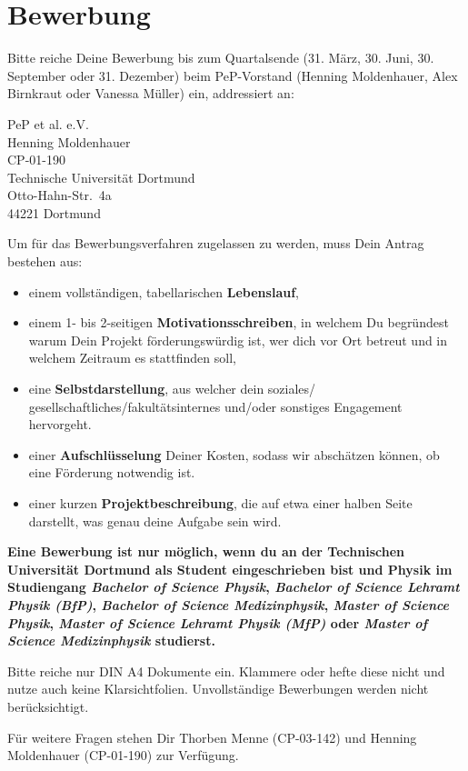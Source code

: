 \documentclass[
  paper=a4,
  fontsize=12pt,
  DIV=16,
  headheight=52pt,
  footheight=45pt,
  headinclude,
  parskip=full,
]{scrartcl}
\begin{document}
\section*{Bewerbung}

Bitte reiche Deine Bewerbung bis zum Quartalsende (31. März, 30. Juni,
30. September oder 31. Dezember) beim PeP-Vorstand
(Henning Moldenhauer, Alex Birnkraut oder Vanessa Müller) ein,
addressiert an:

PeP et al. e.V.\\
Henning Moldenhauer\\
CP-01-190\\[0.5\baselineskip]
Technische Universität Dortmund\\
Otto-Hahn-Str.~4a\\
44221 Dortmund

Um für das Bewerbungsverfahren zugelassen zu werden, muss Dein Antrag bestehen aus:
\begin{itemize}
  \item einem vollständigen, tabellarischen \textbf{Lebenslauf},
  \item einem 1- bis 2-seitigen \textbf{Motivationsschreiben}, in welchem Du
	  begründest warum Dein Projekt förderungswürdig ist, wer dich vor Ort
	  betreut und in welchem Zeitraum es stattfinden soll,
  \item eine \textbf{Selbstdarstellung}, aus welcher dein soziales/
	  gesellschaftliches/fakultätsinternes und/oder sonstiges Engagement hervorgeht.
  \item einer \textbf{Aufschlüsselung} Deiner Kosten, sodass wir abschätzen können,
	  ob eine Förderung notwendig ist.
  \item einer kurzen \textbf{Projektbeschreibung}, die auf etwa einer halben Seite
	  darstellt, was genau deine Aufgabe sein wird.
\end{itemize}

\textbf{%
  Eine Bewerbung ist nur möglich, wenn du an der Technischen Universität Dortmund
  als Student eingeschrieben bist und Physik im Studiengang
  \emph{Bachelor of Science Physik},
  \emph{Bachelor of Science Lehramt Physik (BfP)},
  \emph{Bachelor of Science Medizinphysik},
  \emph{Master of Science Physik},
  \emph{Master of Science Lehramt Physik (MfP)} oder
  \emph{Master of Science Medizinphysik} studierst.
}

Bitte reiche nur DIN A4 Dokumente ein. Klammere oder hefte diese nicht und nutze auch
keine Klarsichtfolien. Unvollständige Bewerbungen werden nicht berücksichtigt.

Für weitere Fragen stehen Dir Thorben Menne (CP-03-142) und
Henning Moldenhauer (CP-01-190) zur Verfügung.
\end{document}
